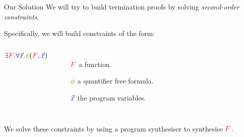 \documentclass[xcolor=pdftex,t,11pt]{beamer}
\newcommand{\red}[1]{\textcolor{red}{#1}}
\newcommand{\blue}[1]{\textcolor{blue}{#1}}
\newcommand{\green}[1]{\textcolor{ta3chameleon}{#1}}
\begin{document}
\begin{frame}[fragile]{Our Solution}
 We will try to build termination proofs by solving \emph{second-order constraints}.

 \pause
 
 \vspace{1em}

 Specifically, we will build constraints of the form:

 \begin{center}
 \begin{columns}
  $\exists \red{F} . \forall \vec{\blue{x}} . \green{\phi}(\red{F}, \vec{\blue{x}})$

  \begin{minipage}{\textwidth}
 \begin{itemize}
  \item[$\red{F}$] a function.
  \item[$\green{\phi}$] a quantifier free formula.
  \item[$\vec{\blue{x}}$] the program variables.
 \end{itemize}
 \end{minipage}
 \end{columns}

 \end{center}

 \vspace{.75em}

 We solve these constraints by using a program synthesiser to synthesise $\red{F}$\footnotemark.
 
\end{frame}
\end{document}

